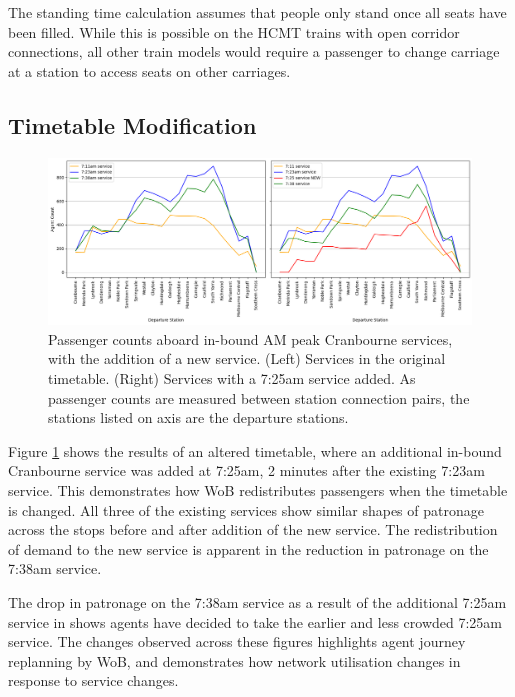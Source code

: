 The standing time calculation assumes that people only stand once all seats have been filled. While this is possible on the HCMT trains with open corridor connections, all other train models would require a passenger to change carriage at a station to access seats on other carriages. 

\subsection{Timetable Modification}
\begin{figure}[ht]
    \centering
    \includegraphics[width=1\linewidth]{images/Case_Study/gtfs_edit.png}
    \caption[Passenger counts between connections aboard in-bound AM peak Cranbourne services, with the addition of a new service]{Passenger counts aboard in-bound AM peak Cranbourne services, with the addition of a new service. (Left) Services in the original timetable. (Right) Services with a 7:25am service added. As passenger counts are measured between station connection pairs, the stations listed on axis are the departure stations.}
    \label{fig:CBE_add_service}
\end{figure}

Figure \ref{fig:CBE_add_service} shows the results of an altered timetable, where an additional in-bound Cranbourne service was added at 7:25am, 2 minutes after the existing 7:23am service. This demonstrates how WoB redistributes passengers when the timetable is changed. All three of the existing services show similar shapes of patronage across the stops before and after addition of the new service. The redistribution of demand to the new service is apparent in the reduction in patronage on the 7:38am service. 

The drop in patronage on the 7:38am service as a result of the additional 7:25am service in  shows agents have decided to take the earlier and less crowded 7:25am service. The changes observed across these figures highlights agent journey replanning by WoB, and demonstrates how network utilisation changes in response to service changes. 

